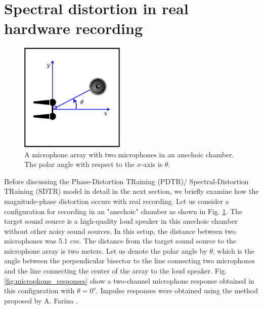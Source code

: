 \documentclass[a4paper]{article}
\begin{document}
\section{Spectral distortion in real hardware recording}
\label{sec:spectral_distortion}
%
%
%
\begin{figure}[t]
  \begin{center}
    \includegraphics[width=50mm]{recording_room_final}
      \caption { A microphone array with two microphones in an anechoic chamber.
      The polar angle with respect to the $x$-axis is $\theta$. }
          \label{fig:recording_room_final}
  \end{center}
\end{figure}
%
%
Before discussing the Phase-Distortion TRaining (PDTR)/
Spectral-Distortion TRaining (SDTR) model in detail
in the next section, we briefly examine how the magnitude-phase distortion
occurs with real recording. Let us consider
a configuration for recording in an "anechoic" chamber as shown in Fig.
\ref{fig:recording_room_final}. The target sound source is a high-quality
loud speaker in this anechoic chamber without other noisy sound sources.
In this setup, the distance between two microphones was 5.1 $cm$.
The distance from the target sound source to the microphone array is two
meters. Let us denote the polar angle by $\theta$, which is the angle
between the perpendicular bisector to the line connecting two microphones
and the line connecting the center of the array to the loud speaker.
Fig. \ref{fig:microphone_responses} show a two-channel microphone
response obtained in this configuration with $\theta=0^{o}$.
Impulse responses were obtained using the method proposed by A. Farina
\cite{A_Frina_AES_2000}.
%
%
\end{document}
